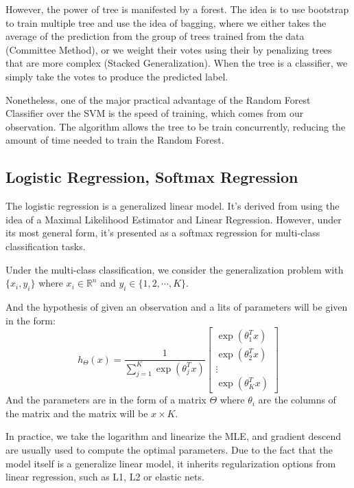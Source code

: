 \documentclass{article}
\begin{document}
        \par
        However, the power of tree is manifested by a forest. The idea is to use bootstrap to train multiple tree and use the idea of bagging, where we either takes the average of the prediction from the group of trees trained from the data (Committee Method), or we weight their votes using their by penalizing trees that are more complex (Stacked Generalization). When the tree is a classifier, we simply take the votes to produce the predicted label. 
        \par
        Nonetheless, one of the major practical advantage of the Random Forest Classifier over the SVM is the speed of training, which comes from our observation. The algorithm allows the tree to be train concurrently, reducing the amount of time needed to train the Random Forest. 
    \subsection*{Logistic Regression, Softmax Regression}
        \hspace{1.1em}
        The logistic regression is a generalized linear model. It's derived from using the idea of a Maximal Likelihood Estimator and Linear Regression. However, under its most general form, it's presented as a softmax regression for multi-class classification tasks. 
        \par
        Under the multi-class classification, we consider the generalization problem with $\{x_i, y_i\}$ where $x_i\in \mathbb{R}^n$ and $y_i \in \{1,2, \cdots , K\}$. 
        \par
        And the hypothesis of given an observation and a lits of parameters will be given in the form: 
        \begin{equation*}\tag{11}\label{eqn:11}
            h_\Theta(x) = 
            \frac{1}{\sum_{j = 1}^{K}\exp(\theta_j^Tx)}
            \begin{bmatrix}
                \exp(\theta_1^Tx) \\ 
                \exp(\theta_2^Tx) \\
                \vdots
                \\
                \exp(\theta_K^Tx)
            \end{bmatrix}
        \end{equation*}
        And the parameters are in the form of a matrix $\Theta$ where $\theta_i$ are the columns of the matrix and the matrix will be $x\times K$. 
        \par
        In practice, we take the logarithm and linearize the MLE, and gradient descend are usually used to compute the optimal parameters. Due to the fact that the model itself is a generalize linear model, it inherits regularization options from linear regression, such as L1, L2 or elastic nets. 
        
\end{document}
